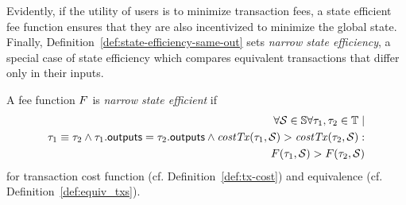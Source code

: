 Evidently, if the utility of users is to minimize transaction fees, a state
efficient fee function ensures that they are also incentivized to minimize the
global state. Finally, Definition~\ref{def:state-efficiency-same-out} sets
\emph{narrow state efficiency}, a special case of state efficiency which
compares equivalent transactions that differ only in their inputs.

\begin{definition}\label{def:state-efficiency-same-out}
    A fee function $F$ is \emph{narrow state efficient} if
    \begin{align*}
        \forall \mathcal{S} \in \mathbb{S} \forall \tau_1, \tau_2 \in \mathbb{T} \mid \\
        \tau_1 \equiv \tau_2 \land \tau_1.\mathsf{outputs} = \tau_2.\mathsf{outputs} \land \mathit{costTx}(\tau_1, \mathcal{S}) > \mathit{costTx}(\tau_2, \mathcal{S}): \\
        F(\tau_1, \mathcal{S}) > F(\tau_2, \mathcal{S})
    \end{align*}
    for transaction cost function (cf. Definition~\ref{def:tx-cost}) and
    equivalence (cf. Definition~\ref{def:equiv_txs}).
\end{definition}
